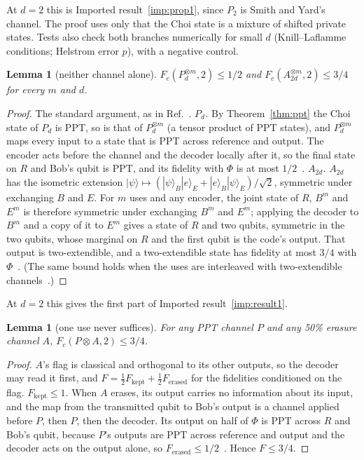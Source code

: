 \documentclass[aps,pra,twocolumn,superscriptaddress,nofootinbib,longbibliography,floatfix]{revtex4-2}
\newtheorem{lemma}[theorem]{Lemma}
\newcommand{\ket}[1]{|#1\rangle}
\newcommand{\mes}{\varPhi}
\begin{document}
\noindent At $d=2$ this is Imported result~\ref{imp:prop1}, since $P_2$ is Smith and Yard's channel. The proof uses only that the Choi state is a mixture of shifted private states. Tests also check both branches numerically for small $d$ (Knill--Laflamme conditions; Helstrom error $p$), with a negative control.

\begin{lemma}[neither channel alone]
\label{lem:alone}
$F_c(P_d^{\otimes m},2)\le1/2$ and $F_c(A_{2d}^{\otimes m},2)\le3/4$ for every $m$ and $d$.
\end{lemma}
\begin{proof}
The standard argument, as in Ref.~\cite{parentin2026onset}. \emph{$P_d$.} By Theorem~\ref{thm:ppt} the Choi state of $P_d$ is PPT, so is that of $P_d^{\otimes m}$ (a tensor product of PPT states), and $P_d^{\otimes m}$ maps every input to a state that is PPT across reference and output. The encoder acts before the channel and the decoder locally after it, so the final state on $R$ and Bob's qubit is PPT, and its fidelity with $\mes$ is at most $1/2$~\cite{horodecki1999general}. \emph{$A_{2d}$.} $A_{2d}$ has the isometric extension $\ket\psi\mapsto(\ket\psi_B\ket e_E+\ket e_B\ket\psi_E)/\sqrt2$, symmetric under exchanging $B$ and $E$. For $m$ uses and any encoder, the joint state of $R$, $B^m$ and $E^m$ is therefore symmetric under exchanging $B^m$ and $E^m$; applying the decoder to $B^m$ and a copy of it to $E^m$ gives a state of $R$ and two qubits, symmetric in the two qubits, whose marginal on $R$ and the first qubit is the code's output. That output is two-extendible, and a two-extendible state has fidelity at most $3/4$ with $\mes$~\cite{johnson2013compatible,kaur2019extendibility}. (The same bound holds when the uses are interleaved with two-extendible channels~\cite{kaur2021resource}.)
\end{proof}
\noindent At $d=2$ this gives the first part of Imported result~\ref{imp:result1}.

\begin{lemma}[one use never suffices]
\label{lem:oneuse}
For any PPT channel $P$ and any 50\% erasure channel $A$, $F_c(P\otimes A,2)\le3/4$.
\end{lemma}
\begin{proof}
$A$'s flag is classical and orthogonal to its other outputs, so the decoder may read it first, and $F=\frac12F_{\mathrm{kept}}+\frac12F_{\mathrm{erased}}$ for the fidelities conditioned on the flag. $F_{\mathrm{kept}}\le1$. When $A$ erases, its output carries no information about its input, and the map from the transmitted qubit to Bob's output is a channel applied before $P$, then $P$, then the decoder. Its output on half of $\mes$ is PPT across $R$ and Bob's qubit, because $P$'s outputs are PPT across reference and output and the decoder acts on the output alone, so $F_{\mathrm{erased}}\le1/2$~\cite{horodecki1999general}. Hence $F\le3/4$.
\end{proof}
\end{document}
